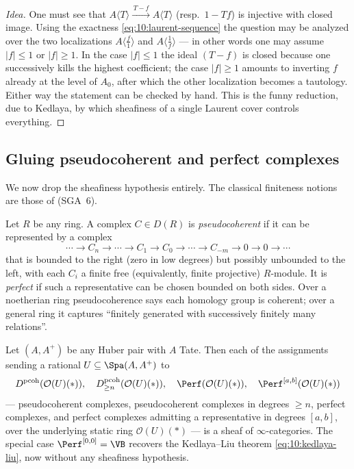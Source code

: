 \begin{proof}[Idea]
One must see that $A\langle T\rangle\xrightarrow{\,T-f\,}A\langle T\rangle$ (resp.\
$1-Tf$) is injective with closed image. Using the exactness
\eqref{eq:10:laurent-sequence} the question may be analyzed over the two
localizations $A\langle\tfrac f1\rangle$ and $A\langle\tfrac1f\rangle$ --- in
other words one may assume $|f|\le1$ or $|f|\ge1$. In the case $|f|\le1$ the ideal
$(T-f)$ is closed because one successively kills the highest coefficient; the case
$|f|\ge1$ amounts to inverting $f$ already at the level of $A_{0}$, after which the
other localization becomes a tautology. Either way the statement can be checked by
hand. This is the funny reduction, due to Kedlaya, by which sheafiness of a single
Laurent cover controls everything.
\end{proof}

\subsection{Gluing pseudocoherent and perfect complexes}

We now drop the sheafiness hypothesis entirely. The classical finiteness notions
are those of \cite{Berthelot_1971} (SGA~6).

\begin{definition}[Pseudocoherent, perfect; SGA~6 \cite{Berthelot_1971}]
\label{def:10:pseudocoherent}
Let $R$ be any ring. A complex $C\in D(R)$ is \emph{pseudocoherent} if it can be
represented by a complex
\begin{equation*}
\cdots\to C_{n}\to\cdots\to C_{1}\to C_{0}\to\cdots\to C_{-m}\to 0\to 0\to\cdots
\end{equation*}
that is bounded to the right (zero in low degrees) but possibly unbounded to the
left, with each $C_{i}$ a finite free (equivalently, finite projective)
$R$-module. It is \emph{perfect} if such a representative can be chosen bounded on
both sides. Over a noetherian ring pseudocoherence says each homology group is
coherent; over a general ring it captures ``finitely generated with successively
finitely many relations''.
\end{definition}

\begin{theorem}
\label{thm:10:gluing}
Let $(A,A^{+})$ be any Huber pair with $A$ Tate. Then each of the assignments
sending a rational $U\subseteq\Spa(A,A^{+})$ to
\begin{equation}
\label{eq:10:gluing}
D^{\mathrm{pcoh}}(\mathcal O(U)(\ast)),\quad
D^{\mathrm{pcoh}}_{\ge n}(\mathcal O(U)(\ast)),\quad
\Perf(\mathcal O(U)(\ast)),\quad
\Perf^{[a,b]}(\mathcal O(U)(\ast))
\end{equation}
--- pseudocoherent complexes, pseudocoherent complexes in degrees $\ge n$,
perfect complexes, and perfect complexes admitting a representative in degrees
$[a,b]$, over the underlying static ring $\mathcal O(U)(\ast)$ --- is a sheaf of
$\infty$-categories. The special case $\Perf^{[0,0]}=\VB$ recovers the
Kedlaya--Liu theorem \eqref{eq:10:kedlaya-liu}, now without any sheafiness
hypothesis.
\end{theorem}

